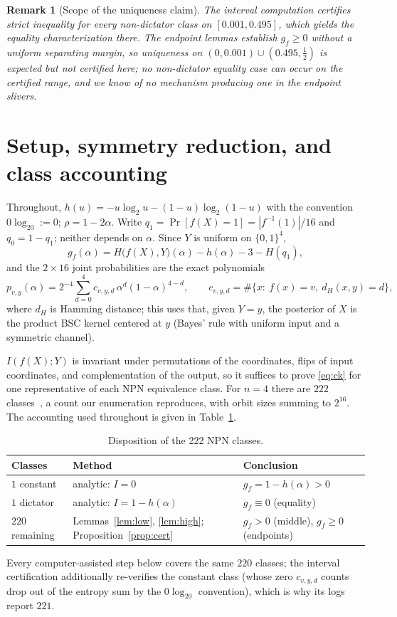 \documentclass[12pt,draftclsnofoot,onecolumn,journal]{IEEEtran}
\newtheorem{remark}{Remark}
\begin{document}
\begin{remark}[Scope of the uniqueness claim]\label{rem:unique}
The interval computation certifies \emph{strict} inequality for every
non-dictator class on $[0.001,0.495]$, which yields the equality
characterization there. The endpoint lemmas establish $g_f\ge0$ without a
uniform separating margin, so uniqueness on $(0,0.001)\cup(0.495,\tfrac12)$
is expected but not certified here; no non-dictator equality case can occur
on the certified range, and we know of no mechanism producing one in the
endpoint slivers.
\end{remark}

\section{Setup, symmetry reduction, and class accounting}\label{sec:setup}

Throughout, $h(u)=-u\log_2 u-(1-u)\log_2(1-u)$ with the convention
$0\log_20:=0$; $\rho=1-2\alpha$. Write $q_1=\Pr[f(X)=1]=|f^{-1}(1)|/16$ and
$q_0=1-q_1$; neither depends on $\alpha$. Since $Y$ is uniform on
$\{0,1\}^4$,
\[
g_f(\alpha)=H\bigl(f(X),Y\bigr)(\alpha)-h(\alpha)-3-H(q_1),
\]
and the $2\times16$ joint probabilities are the exact polynomials
\[
p_{v,y}(\alpha)=2^{-4}\sum_{d=0}^{4}c_{v,y,d}\,\alpha^d(1-\alpha)^{4-d},
\qquad
c_{v,y,d}=\#\{x:\ f(x)=v,\ d_H(x,y)=d\},
\]
where $d_H$ is Hamming distance; this uses that, given $Y=y$, the posterior
of $X$ is the product BSC kernel centered at $y$ (Bayes' rule with uniform
input and a symmetric channel).

$I(f(X);Y)$ is invariant under permutations of the coordinates, flips of
input coordinates, and complementation of the output, so it suffices to prove
\eqref{eq:ck} for one representative of each NPN equivalence class. For
$n=4$ there are $222$ classes~\cite{Harrison65}, a count our enumeration
reproduces, with orbit sizes summing to $2^{16}$. The accounting used
throughout is given in Table~\ref{tab:accounting}.
\begin{table}[t]
\centering
\caption{Disposition of the 222 NPN classes.}
\label{tab:accounting}
\begin{tabular}{lll}
\toprule
\textbf{Classes} & \textbf{Method} & \textbf{Conclusion}\\
\midrule
$1$ constant & analytic: $I=0$ & $g_f=1-h(\alpha)>0$\\
$1$ dictator & analytic: $I=1-h(\alpha)$ & $g_f\equiv0$ (equality)\\
$220$ remaining & Lemmas~\ref{lem:low}, \ref{lem:high}; Proposition~\ref{prop:cert} & $g_f>0$ (middle), $g_f\ge0$ (endpoints)\\
\bottomrule
\end{tabular}
\end{table}
Every computer-assisted step below covers the same $220$ classes; the
interval certification additionally re-verifies the constant class (whose
zero $c_{v,y,d}$ counts drop out of the entropy sum by the $0\log_20$
convention), which is why its logs report $221$.
\end{document}
